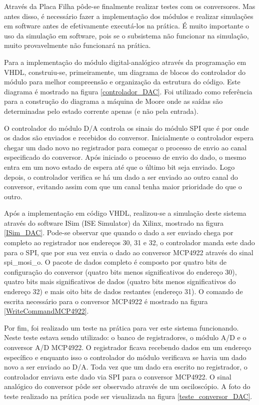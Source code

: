 Através da Placa Filha pôde-se finalmente realizar testes com os conversores. Mas antes disso, é necessário fazer a implementação dos módulos e realizar simulações em software antes de efetivamente executá-los na prática. É muito importante o uso da simulação em software, pois se o subsistema não funcionar na simulação, muito provavelmente não funcionará na prática.

Para a implementação do módulo digital-analógico através da programação em VHDL, construiu-se, primeiramente, um diagrama de blocos do controlador do módulo para melhor compreensão e organização da estrutura do código. Este diagrama é mostrado na figura \ref{controlador_DAC}. Foi utilizado como referência para a construção do diagrama a máquina de Moore onde as saídas são determinadas pelo estado corrente apenas (e não pela entrada). 

O controlador do módulo D/A controla os sinais do módulo SPI que é por onde os dados são enviados e recebidos do conversor. Inicialmente o controlador espera chegar um dado novo no registrador para começar o processo de envio ao canal especificado do conversor. Após iniciado o processo de envio do dado, o mesmo entra em um novo estado de espera até que o último bit seja enviado. Logo depois, o controlador verifica se há um dado a ser enviado ao outro canal do conversor, evitando assim com que um canal tenha maior prioridade do que o outro.

Após a implementação em código VHDL, realizou-se a simulação deste sistema através do software ISim (ISE Simulator) da Xilinx, mostrado na figura \ref{ISim_DAC}. Pode-se observar que quando o dado a ser enviado chega por completo ao registrador nos endereços 30, 31 e 32, o controlador manda este dado para o SPI, que por sua vez envia o dado ao conversor MCP4922 através do sinal spi\_mosi\_o. O pacote de dados completo é composto por quatro bits de configuração do conversor (quatro bits menos significativos do endereço 30), quatro bits mais significativos de dados (quatro bits menos significativos do endereço 32) e mais oito bits de dados restantes (endereço 31). O comando de escrita necessário para o conversor MCP4922 é mostrado na figura \ref{WriteCommandMCP4922}.

Por fim, foi realizado um teste na prática para ver este sistema funcionando. Neste teste estava sendo utilizado: o banco de registradores, o módulo A/D e o conversor A/D MCP4922. O registrador ficava recebendo dados em um endereço específico e enquanto isso o controlador do módulo verificava se havia um dado novo a ser enviado ao D/A. Toda vez que um dado era escrito no registrador, o controlador enviava este dado via SPI para o conversor MCP4922. O sinal analógico do conversor pôde ser observado através de um osciloscópio. A foto do teste realizado na prática pode ser visualizada na figura \ref{teste_conversor_DAC}.

